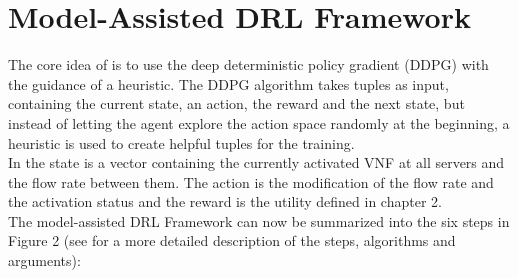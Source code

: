 \section{Model-Assisted DRL Framework}%
\label{sec:drl}
The core idea of \cite{Gu} is to use the deep deterministic policy gradient (DDPG) with the guidance of a heuristic. The DDPG algorithm takes tuples as input, containing the current state, an action, the reward and the next state, but instead of letting the agent explore the action space randomly at the beginning,  a heuristic is used to create helpful tuples for the training.\\
 In \cite{Gu} the state is a vector containing the currently activated VNF at all servers and the flow rate between them. The action is the modification of the flow rate and the activation status and the reward is the utility defined in chapter 2.\\
The model-assisted DRL Framework can now be summarized into the six steps in Figure 2 (see \cite {Gu} for a more detailed description of the steps, algorithms and arguments):%
